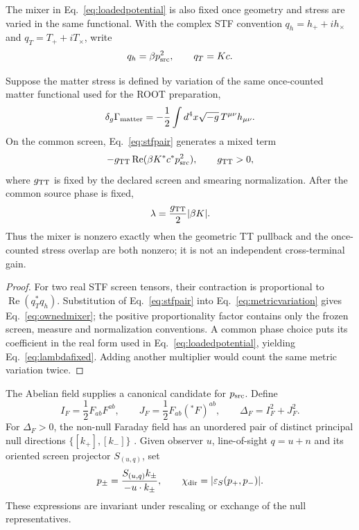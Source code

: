 The mixer in Eq.~\eqref{eq:loadedpotential} is also fixed once geometry and
stress are varied in the same functional.  With the complex STF convention
$q_h=h_++ih_\times$ and $q_T=T_++iT_\times$, write
\begin{equation}
q_h=\beta p_{\rm src}^2,
\qquad q_T=Kc.
\label{eq:stfpair}
\end{equation}

\begin{proposition}
\label{prop:mixownership}
Suppose the matter stress is defined by variation of the same once-counted
matter functional used for the ROOT preparation,
\begin{equation}
\delta_g\Gamma_{\rm matter}
=-\frac{1}{2}\int d^4x\sqrt{-g}\,T^{\mu\nu}h_{\mu\nu}.
\label{eq:metricvariation}
\end{equation}
On the common screen, Eq.~\eqref{eq:stfpair} generates a mixed term
\begin{equation}
-g_{\rm TT}\operatorname{Re}(\beta K^*c^*p_{\rm src}^2),
\qquad g_{\rm TT}>0,
\label{eq:ownedmixer}
\end{equation}
where $g_{\rm TT}$ is fixed by the declared screen and smearing
normalization.  After the common source phase is fixed,
\begin{equation}
\lambda=\frac{g_{\rm TT}}{2}|\beta K|.
\label{eq:lambdafixed}
\end{equation}
Thus the mixer is nonzero exactly when the geometric TT pullback and the
once-counted stress overlap are both nonzero; it is not an independent
cross-terminal gain.
\end{proposition}

\begin{proof}
For two real STF screen tensors, their contraction is proportional to
$\operatorname{Re}(q_T^*q_h)$.  Substitution of
Eq.~\eqref{eq:stfpair} into Eq.~\eqref{eq:metricvariation} gives
Eq.~\eqref{eq:ownedmixer}; the positive proportionality factor contains only
the frozen screen, measure and normalization conventions.  A common phase
choice puts its coefficient in the real form used in
Eq.~\eqref{eq:loadedpotential}, yielding Eq.~\eqref{eq:lambdafixed}.
Adding another multiplier would count the same metric variation twice.
\end{proof}

The Abelian field supplies a canonical candidate for $p_{\rm src}$.  Define
\begin{equation}
 I_F=\frac{1}{2}F_{ab}F^{ab},\qquad
 J_F=\frac{1}{2}F_{ab}({}^*F)^{ab},\qquad
 \Delta_F=I_F^2+J_F^2.
\label{eq:faradayinvariants}
\end{equation}
For $\Delta_F>0$, the non-null Faraday field has an unordered pair of
distinct principal null directions $\{[k_+],[k_-]\}$
\citep{WyllemanCostaNatario2020}.  Given observer $u$, line-of-sight
$q=u+n$ and its oriented screen projector $S_{(u,q)}$, set
\begin{equation}
p_\pm=\frac{S_{(u,q)}k_\pm}{-u\cdot k_\pm},\qquad
\chi_{\rm dir}=|\varepsilon_S(p_+,p_-)|.
\label{eq:directionallift}
\end{equation}
These expressions are invariant under rescaling or exchange of the null
representatives.

